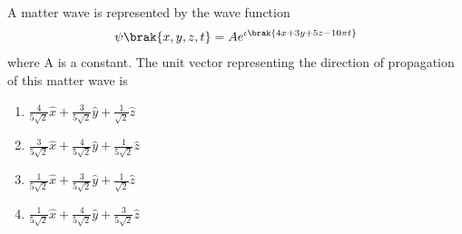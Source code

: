 \begin{enumerate}
    \end{enumerate}

\item A matter wave is represented by the wave function
\begin{align*}
    \psi \brak{x,y,z,t} = A e^{\iota \brak{4x + 3y +5z - 10 \pi t}}
\end{align*}
where A is a constant. The unit vector representing the direction of propagation of this matter wave is
\begin{multicols}{2}
    \begin{enumerate}
        \item $\frac{4}{5\sqrt{2}} \hat{x} + \frac{3}{5\sqrt{2}} \hat{y} + \frac{1}{\sqrt{2}} \hat{z}$
        \item $\frac{3}{5\sqrt{2}} \hat{x} + \frac{4}{5\sqrt{2}} \hat{y} + \frac{1}{5\sqrt{2}} \hat{z}$
        \item $\frac{1}{5\sqrt{2}} \hat{x} + \frac{3}{5\sqrt{2}} \hat{y} + \frac{1}{\sqrt{2}} \hat{z}$
        \item $\frac{1}{5\sqrt{2}} \hat{x} + \frac{4}{5\sqrt{2}} \hat{y} + \frac{3}{5\sqrt{2}} \hat{z}$
    \end{enumerate}
\end{multicols}

